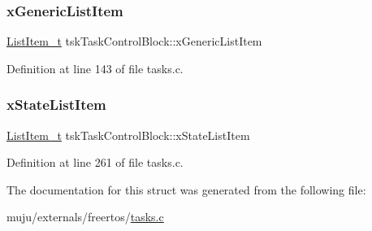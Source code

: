 \subsubsection{\texorpdfstring{x\+Generic\+List\+Item}{xGenericListItem}}
{\footnotesize\ttfamily \hyperlink{externals_2freertos_2include_2list_8h_a1a62d469392f9bfe2443e7efab9c8398}{List\+Item\+\_\+t} tsk\+Task\+Control\+Block\+::x\+Generic\+List\+Item}



Definition at line 143 of file tasks.\+c.

\mbox{\label{structtsk_task_control_block_a16e0d20425d53ac78537e1fdb8834cf6}} 
\subsubsection{\texorpdfstring{x\+State\+List\+Item}{xStateListItem}}
{\footnotesize\ttfamily \hyperlink{externals_2freertos_2include_2list_8h_a1a62d469392f9bfe2443e7efab9c8398}{List\+Item\+\_\+t} tsk\+Task\+Control\+Block\+::x\+State\+List\+Item}



Definition at line 261 of file tasks.\+c.



The documentation for this struct was generated from the following file\+:\begin{DoxyCompactItemize}
\item 
muju/externals/freertos/\hyperlink{externals_2freertos_2tasks_8c}{tasks.\+c}\end{DoxyCompactItemize}
